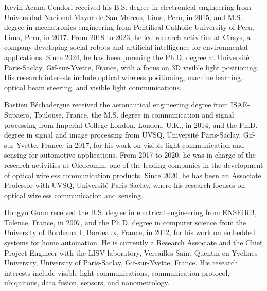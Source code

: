 \documentclass[journal]{IEEEtran}
\begin{document}
\nocite{ITU2023IMT2030,LiuF2022ISAC,Trevlakis2023,Italiano2025,Haas:16,Soltani2023LiFi2,Zhu2025,Wang2024b,Rekkas2023,Zeng2022VCSEL,Safi2025VCSEL3D,Liu:25,mi13070990,SaidEroglu2018,Koonen2021,Qin2020,Li2024,Ma2024,Liu2022,Shi2025,ShiJin2025,Kahn1997,Moreno2008,Bechadergue2024ISAC,acuna2025model,acuna2026robust,acuna2026broadcast,acuna2026experimental}



\begin{IEEEbiographynophoto}{Kevin Acuna-Condori}
received his B.S. degree in electronical engineering from Universidad Nacional Mayor de San Marcos, Lima, Peru, in 2015, and M.S. degree in mechatronics engineering from Pontifical Catholic University of Peru, Lima, Peru, in 2017. 
From 2018 to 2023, he led research activities at Cirsys, a company developing social robots and artificial intelligence for environmental applications.
Since 2024, he has been pursuing the Ph.D. degree at Université Paris-Saclay, Gif-sur-Yvette, France, with a focus on 3D visible light positioning.
His research interests include optical wireless positioning, machine learning, optical beam steering, and visible light communications.
\end{IEEEbiographynophoto}

\begin{IEEEbiographynophoto}{Bastien Béchadergue}
received the aeronautical engineering degree from ISAE-Supaero, Toulouse, France, the M.S. degree in communication and signal processing from Imperial College London, London, U.K., in 2014, and the Ph.D. degree in signal and image processing from UVSQ, Université Paris-Saclay, Gif-sur-Yvette, France, in 2017, for his work on visible light communication and sensing for automotive applications. From 2017 to 2020, he was in charge of the research activities at Oledcomm, one of the leading companies in the development of optical wireless communication products. Since 2020, he has been an Associate Professor with UVSQ, Université Paris-Saclay, where his research focuses on optical wireless communication and sensing.
\end{IEEEbiographynophoto}

\begin{IEEEbiographynophoto}{Hongyu Guan}
received the B.S. degree in electrical engineering from ENSEIRB, Talence, France, in 2007, and the Ph.D. degree in computer science from the University of Bordeaux I, Bordeaux, France, in 2012, for his work on embedded systems for home automation. He is currently a Research Associate and the Chief Project Engineer with the LISV laboratory, Versailles Saint-Quentin-en-Yvelines University, University of Paris-Saclay, Gif-sur-Yvette, France. His research interests include visible light communications, communication protocol, ubiquitous, data fusion, sensors, and nanometrology.
\end{IEEEbiographynophoto}
\end{document}
